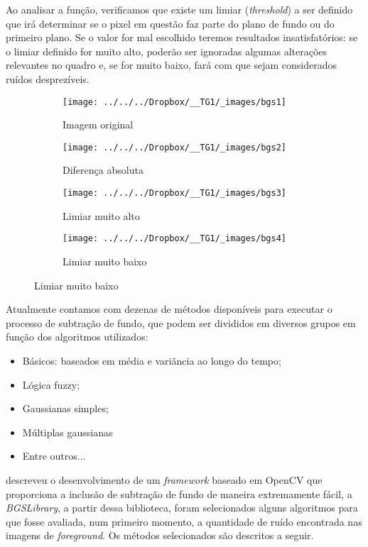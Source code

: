 \documentclass[ecp,tc]{iiufrgs}
\begin{document}
Ao analisar a função, verificamos que existe um limiar (\textit{threshold}) a ser definido  que irá determinar se o pixel em questão faz parte do plano de fundo ou do primeiro plano. Se o valor for mal escolhido teremos resultados insatisfatórios: se o limiar definido for muito alto, poderão ser ignoradas algumas alterações relevantes no quadro e, se for muito baixo, fará com que sejam considerados ruídos desprezíveis.

\begin{figure}
	\centering
	\caption{Definição do \textit{threshold} para \textit{background subtraction}}
	\begin{subfigure}[b]{0.4\textwidth}
		\texttt{[image: ../../../Dropbox/\_\_TG1/\_images/bgs1]}
		\caption{Imagem original}
		\label{fig:bgs1}
	\end{subfigure}
	\quad
	\begin{subfigure}[b]{0.4\textwidth}
		\texttt{[image: ../../../Dropbox/\_\_TG1/\_images/bgs2]}
		\caption{Diferença absoluta}
		\label{fig:bgs2}
	\end{subfigure}
	\hfill
	\begin{subfigure}[b]{0.4\textwidth}
		\texttt{[image: ../../../Dropbox/\_\_TG1/\_images/bgs3]}
		\caption{Limiar muito alto}
		\label{fig:bgs3}
	\end{subfigure}
	\quad
	\begin{subfigure}[b]{0.4\textwidth}
		\texttt{[image: ../../../Dropbox/\_\_TG1/\_images/bgs4]}
		\caption{Limiar muito baixo}
		\label{fig:bgs4}
	\end{subfigure}
	\label{fig:imagebgs}
\end{figure}

Atualmente contamos com dezenas de métodos disponíveis para executar o processo de subtração de fundo, que podem ser divididos em diversos grupos em função dos algoritmos utilizados:
\begin{itemize}
\item Básicos: baseados em média e variância ao longo do tempo;
\item Lógica fuzzy;
\item Gaussianas simples;
\item Múltiplas gaussianas
\item Entre outros...
\end{itemize}


 descreveu o desenvolvimento de um \textit{framework} baseado em OpenCV que proporciona a inclusão de subtração de fundo de maneira extremamente fácil, a \textit{BGSLibrary}, a partir dessa biblioteca, foram selecionados alguns algoritmos para que fosse avaliada, num primeiro momento, a quantidade de ruído encontrada nas imagens de \textit{foreground}. Os métodos selecionados são descritos a seguir.
\end{document}

